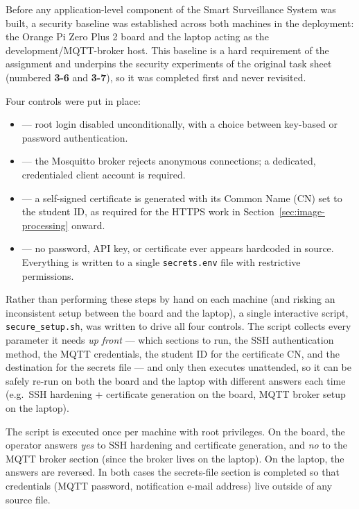 \label{sec:foundation-security}


Before any application-level component of the Smart Surveillance System was
built, a security baseline was established across both machines in the
deployment: the Orange Pi Zero Plus 2 board and the laptop acting as the
development/MQTT-broker host. This baseline is a hard requirement of the
assignment and underpins the security experiments of the original task
sheet (numbered \textbf{3-6} and \textbf{3-7}), so it was completed first
and never revisited.

Four controls were put in place:
\begin{itemize}
    \item {} — root login disabled unconditionally,
    with a choice between key-based or password authentication.
    \item {} — the Mosquitto broker rejects
    anonymous connections; a dedicated, credentialed client account is
    required.
    \item {} — a self-signed
    certificate is generated with its Common Name (CN) set to the
    student ID, as required for the HTTPS work in
    Section~\ref{sec:image-processing} onward.
    \item {} — no password, API key, or
    certificate ever appears hardcoded in source. Everything is written to
    a single \texttt{secrets.env} file with restrictive permissions.
\end{itemize}


Rather than performing these steps by hand on each machine (and risking an
inconsistent setup between the board and the laptop), a single interactive
script, \texttt{secure\_setup.sh}, was written to drive all four controls.
The script collects every parameter it needs \emph{up front} — which
sections to run, the SSH authentication method, the MQTT credentials, the
student ID for the certificate CN, and the destination for the secrets
file — and only then executes unattended, so it can be safely re-run on
both the board and the laptop with different answers each time (e.g.\ SSH
hardening + certificate generation on the board, MQTT broker setup on the
laptop).

\begin{protop}
    The script is executed once per machine with root privileges. On the
    board, the operator answers \emph{yes} to SSH hardening and
    certificate generation, and \emph{no} to the MQTT broker section
    (since the broker lives on the laptop). On the laptop, the answers are
    reversed. In both cases the secrets-file section is completed so that
    credentials (MQTT password, notification e-mail address) live outside
    of any source file.
\end{protop}

